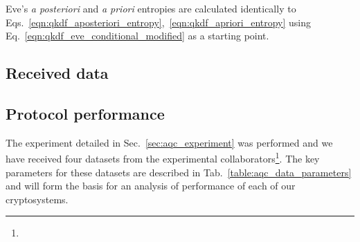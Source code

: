 Eve's \emph{a posteriori} and \emph{a priori} entropies are calculated identically to Eqs.~\ref{eqn:qkdf_aposteriori_entropy},~\ref{eqn:qkdf_apriori_entropy} using Eq.~\ref{eqn:qkdf_eve_conditional_modified} as a starting point.



\subsection{Received data}\label{sec:aqc_received_data}



\subsection{Protocol performance}
The experiment detailed in Sec.~\ref{sec:aqc_experiment} was  performed and we have received four datasets from the experimental collaborators\footnote{}. The key parameters for these datasets are described in Tab.~\ref{table:aqc_data_parameters} and will form the basis for an analysis of performance of each of our cryptosystems.

